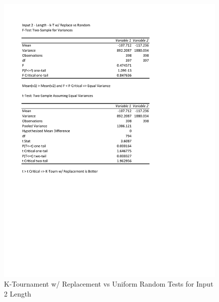 \documentclass[times]{article}
\begin{document}
	\begin{figure}
		\caption{K-Tournament w/ Replacement vs Uniform Random Tests for Input 2 Length}
		\label{fig:2parent2}
		\includegraphics[width=\textwidth]{./t_test/2_parent2.pdf}
	\end{figure}
\end{document}
